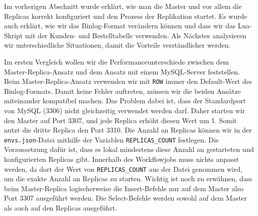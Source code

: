 Im vorherigen Abschnitt wurde erklärt, wie man die Master und vor allem die Replicas korrekt konfiguriert und den Prozess der Replikation startet.
Es wurde auch erklärt, wie wir das Binlog-Format verändern können und dass wir das Lua-Skript mit der Kunden- und Bestelltabelle verwenden.
Als Nächstes analysieren wir unterschiedliche Situationen, damit die Vorteile verständlicher werden.

Im ersten Vergleich wollen wir die Performanceunterschiede zwischen dem Master-Replica-Ansatz und dem Ansatz mit einem MySQL-Server feststellen.
Beim Master-Replica-Ansatz verwenden wir mit \texttt{ROW} immer den Default-Wert des Binlog-Formats.
Damit keine Fehler auftreten, müssen wir die beiden Ansätze miteinander kompatibel machen.
Das Problem dabei ist, dass der Standardport von MySQL (3306) nicht gleichzeitig verwendet werden darf.
Daher starten wir den Master auf Port 3307, und jede Replica erhöht diesen Wert um 1.
Somit nutzt die dritte Replica den Port 3310.
Die Anzahl an Replicas können wir in der \texttt{envs.json}-Datei mithilfe der Variablen \texttt{REPLICAS\_COUNT} festlegen.
Die Voraussetzung dafür ist, dass es lokal mindestens diese Anzahl an gestarteten und konfigurierten Replicas gibt.
Innerhalb des Workflowjobs muss nichts anpasst werden, da dort der Wert von \texttt{REPLICAS\_COUNT} aus der Datei genommen wird, um die exakte Anzahl an Replicas zu starten.
Wichtig ist noch zu erwähnen, dass beim Master-Replica logischerweise die Insert-Befehle nur auf dem Master also Port 3307 ausgeführt werden.
Die Select-Befehle werden sowohl auf dem Master als auch auf den Replicas ausgeführt.

